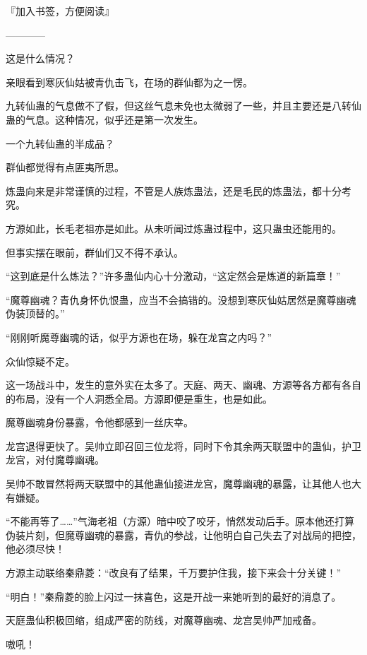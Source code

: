 
\begin{this_body}



『加入书签，方便阅读』

------------

这是什么情况？

亲眼看到寒灰仙姑被青仇击飞，在场的群仙都为之一愣。

九转仙蛊的气息做不了假，但这丝气息未免也太微弱了一些，并且主要还是八转仙蛊的气息。这种情况，似乎还是第一次发生。

一个九转仙蛊的半成品？

群仙都觉得有点匪夷所思。

炼蛊向来是非常谨慎的过程，不管是人族炼蛊法，还是毛民的炼蛊法，都十分考究。

方源如此，长毛老祖亦是如此。从未听闻过炼蛊过程中，这只蛊虫还能用的。

但事实摆在眼前，群仙们又不得不承认。

“这到底是什么炼法？”许多蛊仙内心十分激动，“这定然会是炼道的新篇章！”

“魔尊幽魂？青仇身怀仇恨蛊，应当不会搞错的。没想到寒灰仙姑居然是魔尊幽魂伪装顶替的。”

“刚刚听魔尊幽魂的话，似乎方源也在场，躲在龙宫之内吗？”

众仙惊疑不定。

这一场战斗中，发生的意外实在太多了。天庭、两天、幽魂、方源等各方都有各自的布局，没有一个人洞悉全局。方源即便是重生，也是如此。

魔尊幽魂身份暴露，令他都感到一丝庆幸。

龙宫退得更快了。吴帅立即召回三位龙将，同时下令其余两天联盟中的蛊仙，护卫龙宫，对付魔尊幽魂。

吴帅不敢冒然将两天联盟中的其他蛊仙接进龙宫，魔尊幽魂的暴露，让其他人也大有嫌疑。

“不能再等了……”气海老祖（方源）暗中咬了咬牙，悄然发动后手。原本他还打算伪装片刻，但魔尊幽魂的暴露，青仇的参战，让他明白自己失去了对战局的把控，他必须尽快！

方源主动联络秦鼎菱：“改良有了结果，千万要护住我，接下来会十分关键！”

“明白！”秦鼎菱的脸上闪过一抹喜色，这是开战一来她听到的最好的消息了。

天庭蛊仙积极回缩，组成严密的防线，对魔尊幽魂、龙宫吴帅严加戒备。

嗷吼！


\end{this_body}
